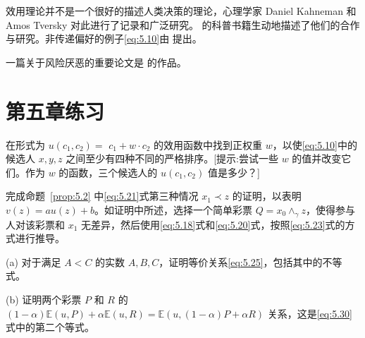 效用理论并不是一个很好的描述人类决策的理论，心理学家 Daniel Kahneman 和 Amos Tversky 对此进行了记录和广泛研究。\citet{lewis2016} 的科普书籍生动地描述了他们的合作与研究。非传递偏好的例子\eqref{eq:5.10}由 \citet{tversky1969} 提出。

一篇关于风险厌恶的重要论文是 \citet{pratt1964} 的作品。

\section{ 第五章练习}\label{sec:5.11}

\begin{exercise}\label{exer:5.1}
在形式为 \(u\left( {{c}_{1},{c}_{2}}\right)  =\)  \({c}_{1} + w \cdot  {c}_{2}\) 的效用函数中找到正权重 \(w\)，以使\eqref{eq:5.10}中的候选人 \(x,y,z\) 之间至少有四种不同的严格排序。[提示:尝试一些 \(w\) 的值并改变它们。作为 \(w\) 的函数，三个候选人的 \(u\left( {{c}_{1},{c}_{2}}\right)\) 值是多少？]
\end{exercise}

\begin{exercise}\label{exer:5.2}
完成命题~\ref{prop:5.2} 中\eqref{eq:5.21}式第三种情况 \({x}_{1} \prec  z\) 的证明，以表明 \(v\left( z\right)  = {au}\left( z\right)  + b\)。如证明中所述，选择一个简单彩票 \(Q = {x}_{0}{ \land  }_{\gamma }z\)，使得参与人对该彩票和 \({x}_{1}\) 无差异，然后使用\eqref{eq:5.18}式和\eqref{eq:5.20}式，按照\eqref{eq:5.23}式的方式进行推导。
\end{exercise}

\begin{exercise}\label{exer:5.3}

(a) 对于满足 \(A < C\) 的实数 \(A,B,C\)，证明等价关系\eqref{eq:5.25}，包括其中的不等式。

(b) 证明两个彩票 \(P\) 和 \(R\) 的 \(\left( {1 - \alpha }\right) \mathbb{E}\left( {u,P}\right)  + \alpha \mathbb{E}\left( {u,R}\right)  = \mathbb{E}\left( {u,\left( {1 - \alpha }\right) P + {\alpha R}}\right)\) 关系，这是\eqref{eq:5.30}式中的第二个等式。
\end{exercise}
